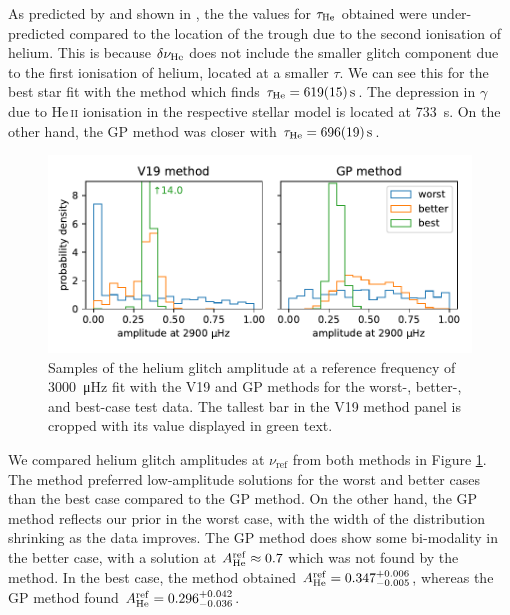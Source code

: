 As predicted by \citet{Houdek.Gough2007} and shown in \citet{Verma.Faria.ea2014}, the the values for \(\tau_\helium\) obtained were under-predicted compared to the location of the trough due to the second ionisation of helium. This is because \(\delta\nu_\helium\) does not include the smaller glitch component due to the first ionisation of helium, located at a smaller \(\tau\). We can see this for the best star fit with the  method which finds \(\tau_\helium = \SI{619(15)}{\second}\). The depression in \(\gamma\) due to He\,\textsc{ii} ionisation in the respective stellar model is located at \SI{733}{\second}. On the other hand, the GP method was closer with \(\tau_\helium = \SI{696(19)}{\second}\).

\begin{figure}[!tb]
    \centering
    \includegraphics{figures/glitch-test-amplitude.pdf}
    \caption{Samples of the helium glitch amplitude at a reference frequency of \SI{3000}{\micro\hertz} fit with the V19 and GP methods for the worst-, better-, and best-case test data. The tallest bar in the V19 method panel is cropped with its value displayed in green text.}
    \label{fig:glitch-test-amplitude}
\end{figure}

We compared helium glitch amplitudes at \(\nu_\mathrm{ref}\) from both methods in Figure \ref{fig:glitch-test-amplitude}. The  method preferred low-amplitude solutions for the worst and better cases than the best case compared to the GP method. On the other hand, the GP method reflects our prior in the worst case, with the width of the distribution shrinking as the data improves. The GP method does show some bi-modality in the better case, with a solution at \(A_\helium^\mathrm{ref} \approx 0.7\) which was not found by the  method. In the best case, the  method obtained \(A_\helium^\mathrm{ref} = 0.347_{-0.005}^{+0.006}\), whereas the GP method found \(A_\helium^\mathrm{ref} = 0.296_{-0.036}^{+0.042}\).

